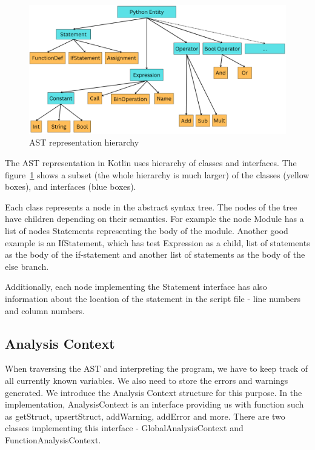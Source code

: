 \begin{figure}[H]
    \caption{AST representation hierarchy}
    \label{fig:python_hierarchy}
    \centering
    \includegraphics[scale=0.5]{img/python_hierarchy}
\end{figure}


The AST representation in Kotlin uses hierarchy of classes and interfaces.
The figure~\ref{fig:python_hierarchy} shows a subset (the whole hierarchy is much larger) of the classes (yellow boxes),
and interfaces (blue boxes).

Each class represents a node in the abstract syntax tree.
The nodes of the tree have children depending on their semantics.
For example the node Module has a list of nodes Statements representing the body of the module.
Another good example is an IfStatement, which has test Expression as a child, list of statements as the body of the
if-statement and another list of statements as the body of the else branch.

Additionally, each node implementing the Statement interface has also information about the location of the statement
in the script file - line numbers and column numbers.

\subsection{Analysis Context}\label{subsec:analysis-context}

When traversing the AST and interpreting the program, we have to keep track of all currently known variables.
We also need to store the errors and warnings generated.
We introduce the Analysis Context structure for this purpose.
In the implementation, AnalysisContext is an interface providing us with function such as getStruct, upsertStruct,
addWarning, addError and more.
There are two classes implementing this interface - GlobalAnalysisContext and FunctionAnalysisContext.

